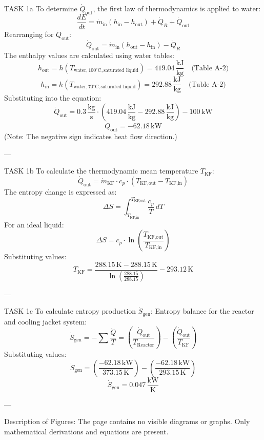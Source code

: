 TASK 1a  
To determine \( \dot{Q}_{\text{out}} \), the first law of thermodynamics is applied to water:  
\[
\frac{dE}{dt} = \dot{m}_{\text{in}} (h_{\text{in}} - h_{\text{out}}) + \dot{Q}_R + \dot{Q}_{\text{out}}
\]  
Rearranging for \( \dot{Q}_{\text{out}} \):  
\[
\dot{Q}_{\text{out}} = \dot{m}_{\text{in}} (h_{\text{out}} - h_{\text{in}}) - \dot{Q}_R
\]  
The enthalpy values are calculated using water tables:  
\[
h_{\text{out}} = h(T_{\text{water}, 100^\circ \text{C}, \text{saturated liquid}}) = 419.04 \, \frac{\text{kJ}}{\text{kg}} \quad \text{(Table A-2)}
\]  
\[
h_{\text{in}} = h(T_{\text{water}, 70^\circ \text{C}, \text{saturated liquid}}) = 292.88 \, \frac{\text{kJ}}{\text{kg}} \quad \text{(Table A-2)}
\]  
Substituting into the equation:  
\[
\dot{Q}_{\text{out}} = 0.3 \, \frac{\text{kg}}{\text{s}} \cdot (419.04 \, \frac{\text{kJ}}{\text{kg}} - 292.88 \, \frac{\text{kJ}}{\text{kg}}) - 100 \, \text{kW}
\]  
\[
\dot{Q}_{\text{out}} = -62.18 \, \text{kW}
\]  
(Note: The negative sign indicates heat flow direction.)

---

TASK 1b  
To calculate the thermodynamic mean temperature \( T_{\text{KF}} \):  
\[
\dot{Q}_{\text{out}} = \dot{m}_{\text{KF}} \cdot c_p \cdot (T_{\text{KF,out}} - T_{\text{KF,in}})
\]  
The entropy change is expressed as:  
\[
\Delta S = \int_{T_{\text{KF,in}}}^{T_{\text{KF,out}}} \frac{c_p}{T} \, dT
\]  
For an ideal liquid:  
\[
\Delta S = c_p \cdot \ln \left( \frac{T_{\text{KF,out}}}{T_{\text{KF,in}}} \right)
\]  
Substituting values:  
\[
T_{\text{KF}} = \frac{288.15 \, \text{K} - 288.15 \, \text{K}}{\ln \left( \frac{288.15}{288.15} \right)} - 293.12 \, \text{K}
\]  

---

TASK 1c  
To calculate entropy production \( \dot{S}_{\text{gen}} \):  
Entropy balance for the reactor and cooling jacket system:  
\[
\dot{S}_{\text{gen}} = -\sum \frac{\dot{Q}}{T} = \left( \frac{\dot{Q}_{\text{out}}}{T_{\text{Reactor}}} \right) - \left( \frac{\dot{Q}_{\text{out}}}{T_{\text{KF}}} \right)
\]  
Substituting values:  
\[
\dot{S}_{\text{gen}} = \left( \frac{-62.18 \, \text{kW}}{373.15 \, \text{K}} \right) - \left( \frac{-62.18 \, \text{kW}}{293.15 \, \text{K}} \right)
\]  
\[
\dot{S}_{\text{gen}} = 0.047 \, \frac{\text{kW}}{\text{K}}
\]  

---

Description of Figures:  
The page contains no visible diagrams or graphs. Only mathematical derivations and equations are present.